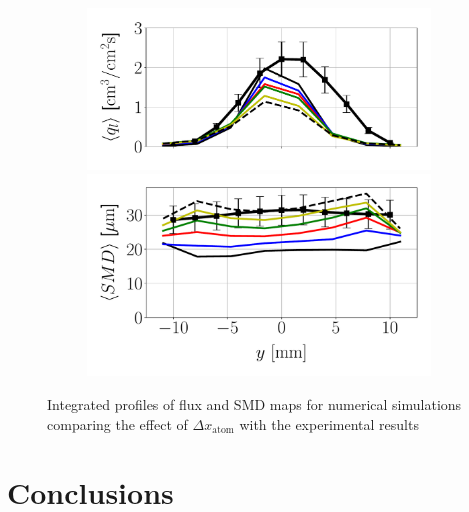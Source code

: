 \begin{figure}[h!]
\begin{subfigure}[b]{0.4\textwidth}
	\flushleft
   \includegraphics[scale=0.35]{./part2_developments/figures_ch6_lagrangian_JICF/params_dx_atom/profiles/flux_along_y}\\
   \vspace{-0.16in}
   \includegraphics[scale=0.35]{./part2_developments/figures_ch6_lagrangian_JICF/params_dx_atom/profiles/SMD_along_y}
\end{subfigure}

\caption{Integrated profiles of flux and SMD maps for numerical simulations comparing the effect of $\Delta x_\mathrm{atom}$ with the experimental results}
\label{fig:profiles_LGS_JICF_dx_aom}
\end{figure}





\clearpage


\section{Conclusions}

